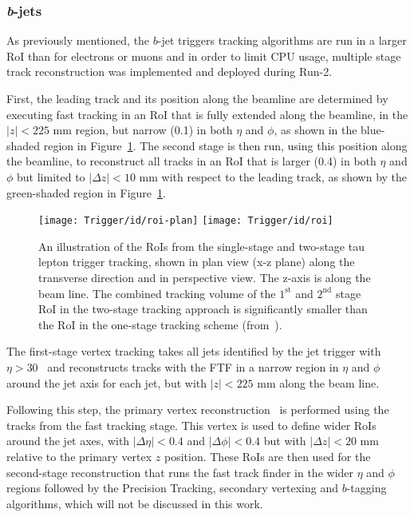			\subsubsection*{\emph{b}-jets}

				As previously mentioned, the $b$-jet triggers tracking algorithms are run in a larger \ac{RoI} than for electrons or muons and in order to limit CPU usage, multiple stage track reconstruction was implemented and deployed during Run-2.

				First, the leading track and its position along the beamline are determined by executing fast tracking in an \ac{RoI} that is fully extended along the beamline, in the $|z|<225$ mm region, but narrow (0.1) in both $\eta$ and $\phi$, as shown in the blue-shaded region in Figure~\ref{fig:idroi}. The second stage is then run, using this position along the beamline, to reconstruct all tracks in an \ac{RoI} that is larger (0.4) in both $\eta$ and $\phi$ but limited to $|\Delta z|<10$ mm with respect to the leading track, as shown by the green-shaded region in Figure~\ref{fig:idroi}.

				\begin{figure}[!htb]
					\centering
					\texttt{[image: Trigger/id/roi-plan]}
					\texttt{[image: Trigger/id/roi]}
					\caption{An illustration of the \ac{RoI}s from the single-stage and two-stage tau lepton trigger tracking, shown in plan view (x-z plane) along the transverse direction and in perspective view. The z-axis is along the beam line. The combined tracking volume of the $1^{\mathrm{st}}$ and $2^{\mathrm{nd}}$ stage \ac{RoI} in the two-stage tracking approach is significantly smaller than the \ac{RoI} in the one-stage tracking scheme (from~\cite{ATLASTrigger2015}).}
					\label{fig:idroi}
				\end{figure}

				The first-stage vertex tracking takes all jets identified by the jet trigger with $\eta > 30$ \GeV\ and reconstructs tracks with the FTF in a narrow region in $\eta$ and $\phi$ around the jet axis for each jet, but with $|z|<225$ mm along the beam line.
				
				Following this step, the primary vertex reconstruction~\cite{ATLAS-CONF-2010-069} is performed using the tracks from the fast tracking stage. This vertex is used to define wider \ac{RoI}s around
				the jet axes, with $|\Delta\eta|<0.4$ and $|\Delta\phi|<0.4$ but with $|\Delta z|<20$ mm relative to the primary vertex $z$ position. These \ac{RoI}s are then used for the second-stage 
				reconstruction that runs the fast track finder in the wider $\eta$ and $\phi$ regions followed by the Precision Tracking, secondary vertexing and $b$-tagging algorithms, which will not be discussed in this work.

